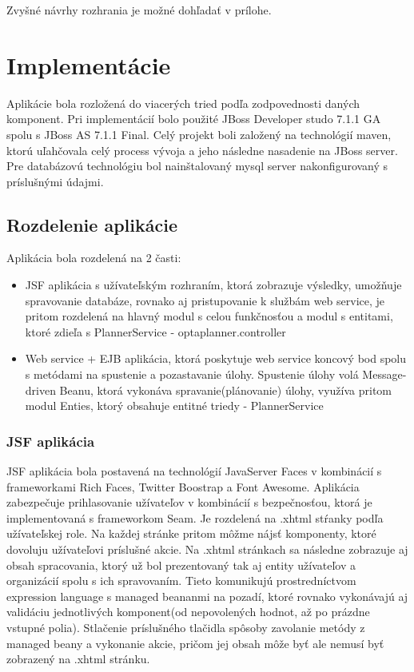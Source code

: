 Zvyšné návrhy rozhrania je možné dohľadať v prílohe.






\section{Implementácie}
Aplikácie bola rozložená do viacerých tried podľa zodpovednosti daných komponent. Pri implementácií bolo použité JBoss Developer studo 7.1.1 GA spolu s JBoss AS 7.1.1 Final. Celý projekt boli založený na technológií maven, ktorú uľahčovala celý process vývoja a jeho následne nasadenie na JBoss server. Pre databázovú technológiu bol nainštalovaný mysql server nakonfigurovaný s príslušnými údajmi.

\subsection{Rozdelenie aplikácie}

	Aplikácia bola rozdelená na 2 časti:
	\begin{itemize}
	\item JSF aplikácia s užívateľským rozhraním, ktorá zobrazuje výsledky, umožňuje spravovanie databáze, rovnako aj pristupovanie k službám web service, je pritom rozdelená na hlavný modul s celou funkčnosťou a modul s entitami, ktoré zdieľa s PlannerService - optaplanner.controller
	\item Web service + EJB aplikácia, ktorá poskytuje web service koncový bod spolu s metódami na spustenie a pozastavanie úlohy. Spustenie úlohy volá Message-driven Beanu, ktorá vykonáva spravanie(plánovanie) úlohy, využíva pritom modul Enties, ktorý obsahuje entitné triedy - PlannerService

	\end{itemize}




\subsubsection{JSF aplikácia}
JSF aplikácia bola postavená na technológií JavaServer Faces v kombinácií s frameworkami Rich Faces, Twitter Boostrap a Font Awesome.  Aplikácia zabezpečuje prihlasovanie užívateľov v kombinácií s bezpečnosťou, ktorá je implementovaná s frameworkom Seam. Je rozdelená na .xhtml stŕanky podľa užívateľskej role. Na každej stránke pritom môžme nájsť komponenty, ktoré dovoluju užívateľovi príslušné akcie. Na .xhtml stránkach sa následne zobrazuje aj obsah spracovania, ktorý už bol prezentovaný tak aj entity užívateľov a organizácií spolu s ich spravovaním. Tieto komunikujú prostredníctvom expression language s managed beananmi na pozadí, ktoré rovnako vykonávajú aj validáciu jednotlivých komponent(od nepovolených hodnot, až po prázdne vstupné polia). Stlačenie príslušného tlačidla spôsoby zavolanie metódy z managed beany a vykonanie akcie, pričom jej obsah môže byť ale nemusí byť zobrazený na .xhtml stránku.
	

